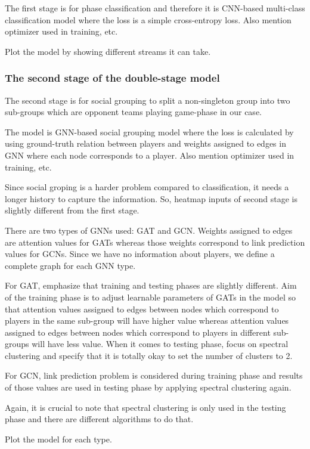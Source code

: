 \documentclass[doctype=mastersthesis,lang=english,BCOR=15mm,biblatex]{ldvbook}
\begin{document}
The first stage is for phase classification and therefore it is CNN-based multi-class classification model where the loss is a simple cross-entropy loss. Also mention optimizer used in training, etc.

Plot the model by showing different streams it can take.

\subsubsection{The second stage of the double-stage model}

The second stage is for social grouping to split a non-singleton group into two sub-groups which are opponent teams playing game-phase in our case.

The model is GNN-based social grouping model where the loss is calculated by using ground-truth relation between players and weights assigned to edges in GNN where each node corresponds to a player. Also mention optimizer used in training, etc.

Since social groping is a harder problem compared to classification, it needs a longer history to capture the information. So, heatmap inputs of second stage is slightly different from the first stage.

There are two types of GNNs used: GAT and GCN. Weights assigned to edges are attention values for GATs whereas those weights correspond to link prediction values for GCNs. Since we have no information about players, we define a complete graph for each GNN type.

For GAT, emphasize that training and testing phases are slightly different. Aim of the training phase is to adjust learnable parameters of GATs in the model so that attention values assigned to edges between nodes which correspond to players in the same sub-group will have higher value whereas attention values assigned to edges between nodes which correspond to players in different sub-groups will have less value. When it comes to testing phase, focus on spectral clustering and specify that it is totally okay to set the number of clusters to 2.

For GCN, link prediction problem is considered during training phase and results of those values are used in testing phase by applying spectral clustering again.

Again, it is crucial to note that spectral clustering is only used in the testing phase and there are different algorithms to do that.

Plot the model for each type.
\end{document}
